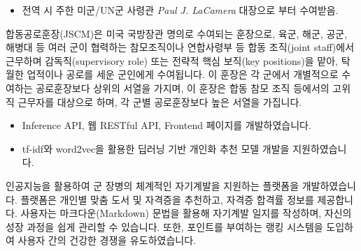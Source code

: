\documentclass[10pt, a4paper]{cvhari}
\begin{document}
    {
        \begin{itemize}
            \item 전역 시 주한 미군/UN군 사령관 \textit{Paul J. LaCamera} 대장으로 부터 수여받음.
        \end{itemize}
        합동공로훈장(JSCM)은 미국 국방장관 명의로 수여되는 훈장으로, 육군, 해군, 공군, 해병대 등 여러 군이 협력하는 참모조직이나 연합사령부 등 합동 조직(joint staff)에서 근무하며 감독직(supervisory role) 또는 전략적 핵심 보직(key positions)을 맡아, 탁월한 업적이나 공로를 세운 군인에게 수여됩니다. 이 훈장은 각 군에서 개별적으로 수여하는 공로훈장보다 상위의 서열을 가지며, 이 훈장은 합동 참모 조직 등에서의 고위직 근무자를 대상으로 하며, 각 군별 공로훈장보다 높은 서열을 가집니다.




    }\par

    \smallskip 
    \divider
    \smallskip

    {
        \begin{itemize}
            \item Inference API, 웹 RESTful API, Frontend 페이지를 개발하였습니다.
            \item tf-idf와 word2vec을 활용한 딥러닝 기반 개인화 추천 모델 개발을 지원하였습니다.
        \end{itemize}
        인공지능을 활용하여 군 장병의 체계적인 자기계발을 지원하는 플랫폼을 개발하였습니다. 플랫폼은 개인별 맞춤 도서 및 자격증을 추천하고, 자격증 합격률 정보를 제공합니다. 사용자는 마크다운(Markdown) 문법을 활용해 자기계발 일지를 작성하며, 자신의 성장 과정을 쉽게 관리할 수 있습니다. 또한, 포인트를 부여하는 랭킹 시스템을 도입하여 사용자 간의 건강한 경쟁을 유도하였습니다.
    }\par

    \smallskip 
    \divider
    \smallskip
\end{document}

